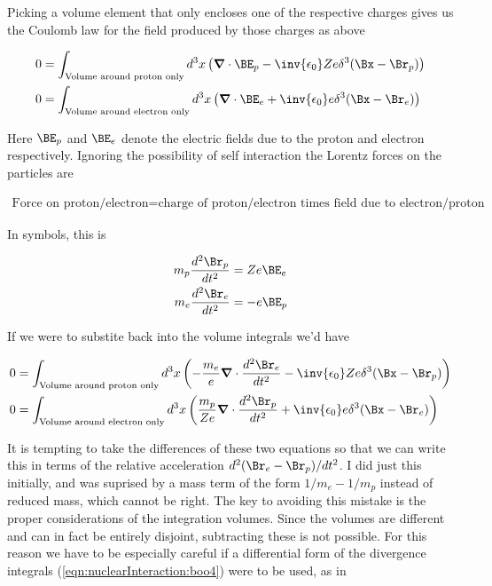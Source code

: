 Picking a volume element that only encloses one of the respective charges gives us the Coulomb law for the field produced by those charges as above

\begin{align}\label{eqn:nuclearInteraction:boo3}
0 &= \int_{\text{Volume around proton only}} d^3 x \left( \spacegrad \cdot \BE_p - \inv{\epsilon_0} Z e \delta^3(\Bx - \Br_p) \right) \\
0 &= \int_{\text{Volume around electron only}} d^3 x \left( \spacegrad \cdot \BE_e + \inv{\epsilon_0} e \delta^3(\Bx - \Br_e) \right)
\end{align}

Here $\BE_p$ and $\BE_e$ denote the electric fields due to the proton and electron respectively.  Ignoring the possibility of self interaction the Lorentz forces on the particles are

\begin{align*}
\text{Force on proton/electron} = \text{charge of proton/electron times field due to electron/proton}
\end{align*}

In symbols, this is

\begin{align}\label{eqn:nuclearInteraction:boo4}
m_p \frac{d^2 \Br_p}{dt^2} &= Z e \BE_e \\
m_e \frac{d^2 \Br_e}{dt^2} &= - e \BE_p
\end{align}

If we were to substite back into the volume integrals we'd have

\begin{align}\label{eqn:nuclearInteraction:boo5}
0 &= \int_{\text{Volume around proton only}} d^3 x \left( -\frac{m_e}{e}\spacegrad \cdot \frac{d^2 \Br_e}{dt^2} - \inv{\epsilon_0} Z e \delta^3(\Bx - \Br_p) \right) \\
0 &= \int_{\text{Volume around electron only}} d^3 x \left( \frac{m_p}{Z e}\spacegrad \cdot \frac{d^2 \Br_p}{dt^2} + \inv{\epsilon_0} e \delta^3(\Bx - \Br_e) \right)
\end{align}

It is tempting to take the differences of these two equations so that we can write this in terms of the relative acceleration $d^2 (\Br_e - \Br_p)/dt^2$.  I did just this initially, and was suprised by a mass term of the form $1/m_e - 1/m_p$ instead of reduced mass, which cannot be right.  The key to avoiding this mistake is the proper considerations of the integration volumes.  Since the volumes are different and can in fact be entirely disjoint, subtracting these is not possible.  For this reason we have to be especially careful if a differential form of the divergence integrals (\ref{eqn:nuclearInteraction:boo4}) were to be used, as in

